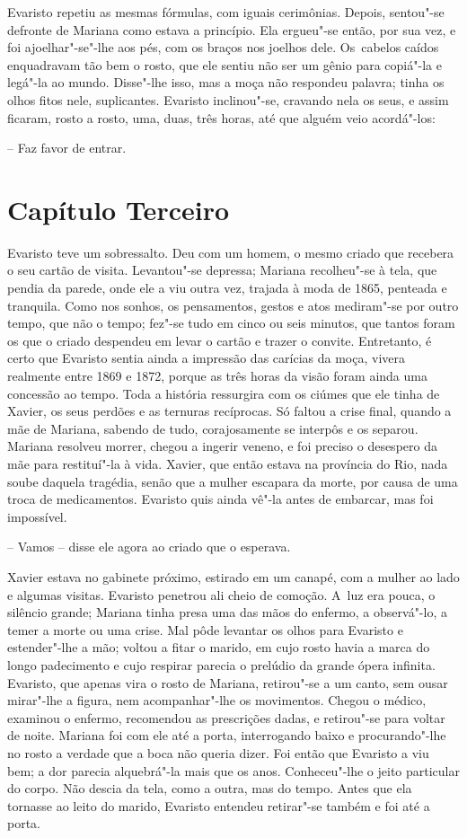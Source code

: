 Evaristo repetiu as mesmas fórmulas, com iguais cerimônias. Depois,
sentou"-se defronte de Mariana como estava a princípio. Ela ergueu"-se
então, por sua vez, e foi ajoelhar"-se"-lhe aos pés, com os braços nos
joelhos dele. Os~cabelos caídos enquadravam tão bem o rosto, que ele
sentiu não ser um gênio para copiá"-la e legá"-la ao mundo. Disse"-lhe
isso, mas a moça não respondeu palavra; tinha os olhos fitos nele,
suplicantes. Evaristo inclinou"-se, cravando nela os seus, e assim
ficaram, rosto a rosto, uma, duas, três horas, até que alguém veio
acordá"-los:

-- Faz favor de entrar.

\section{Capítulo Terceiro}

Evaristo teve um sobressalto. Deu com um homem, o mesmo criado que
recebera o seu cartão de visita. Levantou"-se depressa; Mariana
recolheu"-se à tela, que pendia da parede, onde ele a viu outra vez,
trajada à moda de 1865, penteada e tranquila. Como nos sonhos, os
pensamentos, gestos e atos mediram"-se por outro tempo, que não o tempo;
fez"-se tudo em cinco ou seis minutos, que tantos foram os que o criado
despendeu em levar o cartão e trazer o convite. Entretanto, é certo que
Evaristo sentia ainda a impressão das carícias da moça, vivera realmente
entre 1869 e 1872, porque as três horas da visão foram ainda uma
concessão ao tempo. Toda a história ressurgira com os ciúmes que ele
tinha de Xavier, os seus perdões e as ternuras recíprocas. Só faltou a
crise final, quando a mãe de Mariana, sabendo de tudo, corajosamente se
interpôs e os separou. Mariana resolveu morrer, chegou a ingerir veneno,
e foi preciso o desespero da mãe para restituí"-la à vida. Xavier, que
então estava na província do Rio, nada soube daquela tragédia, senão que
a mulher escapara da morte, por causa de uma troca de medicamentos.
Evaristo quis ainda vê"-la antes de embarcar, mas foi impossível.

-- Vamos -- disse ele agora ao criado que o esperava.

Xavier estava no gabinete próximo, estirado em um canapé, com a mulher
ao lado e algumas visitas. Evaristo penetrou ali cheio de comoção. A~luz
era pouca, o silêncio grande; Mariana tinha presa uma das mãos do
enfermo, a observá"-lo, a temer a morte ou uma crise. Mal pôde levantar
os olhos para Evaristo e estender"-lhe a mão; voltou a fitar o marido, em
cujo rosto havia a marca do longo padecimento e cujo respirar parecia o
prelúdio da grande ópera infinita. Evaristo, que apenas vira o rosto de
Mariana, retirou"-se a um canto, sem ousar mirar"-lhe a figura, nem
acompanhar"-lhe os movimentos. Chegou o médico, examinou o enfermo,
recomendou as prescrições dadas, e retirou"-se para voltar de noite.
Mariana foi com ele até a porta, interrogando baixo e procurando"-lhe no
rosto a verdade que a boca não queria dizer. Foi então que Evaristo a
viu bem; a dor parecia alquebrá"-la mais que os anos. Conheceu"-lhe o
jeito particular do corpo. Não descia da tela, como a outra, mas do
tempo. Antes que ela tornasse ao leito do marido, Evaristo entendeu
retirar"-se também e foi até a porta.

